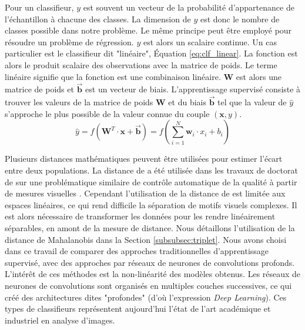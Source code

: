 Pour un classifieur, $y$ est souvent un vecteur de la probabilité d'appartenance de l'échantillon à chacune des classes.
La dimension de $y$ est donc le nombre de classes possible dans notre problème.
Le même principe peut être employé pour résoudre un problème de régression.
$y$ est alors un scalaire continue.
Un cas particulier est le classifieur dit "linéaire", Équation \ref{eq:clf_linear}.
La fonction est alors le produit scalaire des observations avec la matrice de poids.
Le terme linéaire signifie que la fonction est une combinaison linéaire.
$\mathbf{W}$ est alors une matrice de poids et $\vec{\mathbf{b}}$ est un vecteur de biais. L'apprentissage supervisé consiste à trouver les valeurs de la matrice de poids $\mathbf{W}$ et du biais $\vec{\mathbf{b}}$ tel que la valeur de $\hat{y}$ s'approche le plus possible de la valeur connue du couple $(\mathbf{x}, y)$.
\begin{equation} \label{eq:clf_linear}
\hat{y} = f\left(\mathbf{W}^{T} \cdot \mathbf{x} + \vec{\mathbf{b}}\right) = f\left(\sum_{i=1}^{N} \mathbf{w}_{i} \cdot x_{i} + b_{i}\right)
\end{equation}

Plusieurs distances mathématiques peuvent être utilisées pour estimer l'écart entre deux populations.
La distance de \citeauthor{mahalanobis_generalised_1936} \cite{mahalanobis_generalised_1936} a été utilisée dans les travaux de doctorat de \citeauthor{lacombe_exploitation_2018a} sur une problématique similaire de contrôle automatique de la qualité à partir de mesures visuelles \cite{lacombe_exploitation_2018a}.
Cependant l'utilisation de la distance de \citeauthor{mahalanobis_generalised_1936} est limitée aux espaces linéaires, ce qui rend difficile la séparation de motifs visuels complexes.
Il est alors nécessaire de transformer les données pour les rendre linéairement séparables, en amont de la mesure de distance.
Nous détaillons l'utilisation de la distance de Mahalanobis dans la Section \ref{subsubsec:triplet}.
Nous avons choisi dans ce travail de comparer des approches traditionnelles d'apprentissage supervisé, avec des approches par réseaux de neurones de convolutions profonds.
L'intérêt de ces méthodes est la non-linéarité des modèles obtenus.
Les réseaux de neurones de convolutions sont organisés en multiples couches successives, ce qui créé des architectures dites "profondes" (d'où l'expression \textit{Deep Learning}).
Ces types de classifieurs représentent aujourd'hui l'état de l'art académique et industriel en analyse d'images.

